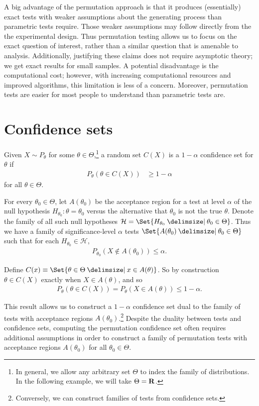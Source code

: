 A big advantage of the permutation approach is that it produces (essentially) exact 
tests with weaker assumptions 
about the generating process than parametric tests require.
Those weaker assumptions may follow directly from the 
the experimental design.  Thus
permutation testing allows us to focus on the exact question of interest,
rather than a similar question that is amenable to analysis.  Additionally,
justifying these claims does not require asymptotic theory; 
we get exact results for small samples.  A potential disadvantage is the
computational cost; however, with increasing computational resources and
improved algorithms, this limitation is less of a concern.
Moreover, permutation tests are easier for most people to understand than
parametric tests are.

\section{Confidence sets}

Given $X \sim P_\theta$ for some $\theta \in \Theta$,\footnote{In general, we allow any
arbitrary set $\Theta$ to index the family of distributions. In the following example, we will take $\Theta =\mathbf{R}$.} a random set
$C(X)$ is a $1 - \alpha$ confidence set for $\theta$ if
\begin{align*}
P_\theta(\theta \in C(X)) &\ge 1 - \alpha
\end{align*}
for all $\theta \in \Theta$.

For every $\theta_0 \in \Theta$, let $A(\theta_0)$ be the acceptance region for
a test at level $\alpha$ of the null hypothesis $H_{\theta_0}: \theta =
\theta_0$ versus the alternative that $\theta_0$ is not the true $\theta$.
Denote the family of all such null hypotheses $\mathcal{H} = \Set{H_{\theta_0}
\given \theta_0 \in \Theta}$.  Thus we have a family of significance-level
$\alpha$ tests $\Set{A(\theta_0) \given \theta_0 \in \Theta}$ such that for
each $H_{\theta_0} \in \mathcal{H}$,
\begin{align*}
P_{\theta_0}(X \notin A(\theta_0)) \le \alpha.
\end{align*}

Define $C(x) \equiv \Set{\theta \in \Theta \given x \in A(\theta)}$.
So by construction $\theta \in C(X)$ exactly when $X \in A(\theta)$, and so
\begin{align*}
P_{\theta}(\theta \in C(X)) = P_{\theta}(X \in A(\theta)) \le 1 - \alpha.
\end{align*}

This result allows us to construct a $1-\alpha$ confidence set dual to
the family of tests with acceptance regions $A(\theta_0)$.\footnote{Conversely,
we can construct families of tests from confidence sets.}  Despite the duality
between tests and confidence sets, computing the permutation confidence set
often requires additional assumptions in order to construct a family of
permutation tests with acceptance regions $A(\theta_0)$ for all $\theta_0 \in
\Theta$.

